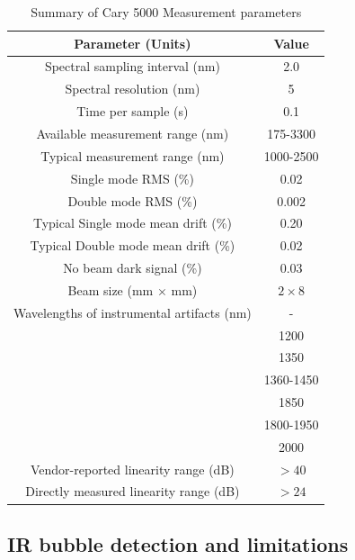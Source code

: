 \documentclass[osajnl,preprint,showpacs,superscriptaddress,12pt]{revtex4-1} %
\begin{document}
\begin{table}[h!]
\caption{Summary of Cary 5000 Measurement parameters \label{tab:Cary5000pars}}
\begin{center}
\begin{tabular}{ c c }
\hline
        Parameter (Units) & Value \\ 
\hline
        Spectral sampling interval (nm) & 2.0 \\
        Spectral resolution (nm) & 5 \\
        Time per sample (s) & 0.1 \\
        Available measurement range (nm) & 175-3300 \\
        Typical measurement range (nm) & 1000-2500 \\
	Single mode RMS  (\%) & 0.02 \\
	Double mode RMS  (\%) & 0.002 \\
	Typical Single mode mean drift (\%) & 0.20 \\
	Typical Double mode mean drift (\%) & 0.02 \\
	No beam dark signal (\%) & 0.03 \\
 	Beam size (mm $\times$ mm) & $2 \times 8$ \\
	Wavelengths of instrumental artifacts (nm) & - \\
        		 & 1200 \\
		 & 1350 \\
		 & 1360-1450\\
		 & 1850 \\
		 & 1800-1950 \\
		 & 2000 \\
        Vendor-reported linearity range (dB) & $>40$ \\
        Directly measured linearity range (dB) & $>24$ \\
    \hline
    \end{tabular}
\end{center}
\end{table}


\subsection{IR bubble detection and limitations}
\end{document}
